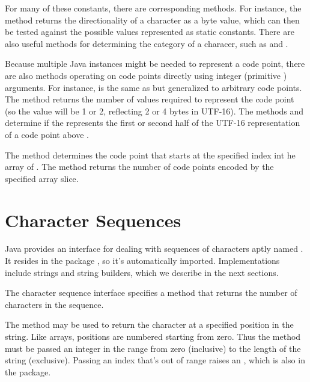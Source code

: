 For many of these constants, there are corresponding methods.  For
instance, the method  returns the
directionality of a character as a byte value, which can then be tested
against the possible values represented as static constants.  There
are also useful methods for determining the category of a characer,
such as  and .

Because multiple Java  instances might be needed to
represent a code point, there are also methods operating on code
points directly using integer (primitive ) arguments.  For
instance,  is the same as 
but generalized to arbitrary code points.  The method
 returns the number of  values
required to represent the code point (so the value will be 1 or 2,
reflecting 2 or 4 bytes in UTF-16).  The methods
 and  determine
if the  represents the first or second half of the UTF-16
representation of a code point above .  

The method  determines the code point
that starts at the specified index int he array of .  The
method  returns the number of
code points encoded by the specified  array slice.

\section{Character Sequences}

Java provides an interface for dealing with sequences of characters
aptly named .  It resides in the package
, so it's automatically imported.  Implementations
include strings and string builders, which we describe in the next
sections.

The character sequence interface specifies a method 
that returns the number of characters in the sequence.  

The method  may be used to return the character at a
specified position in the string.  Like arrays, positions are numbered
starting from zero.  Thus the method must be passed an integer in the
range from zero (inclusive) to the length of the string (exclusive).
Passing an index that's out of range raises an
, which is also in the
 package.

